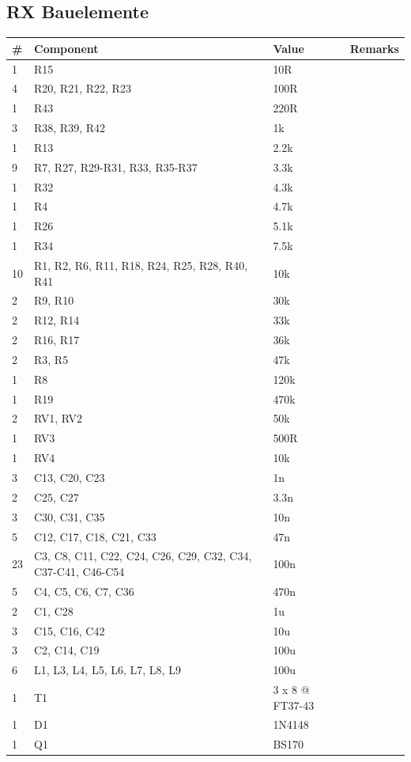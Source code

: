 \documentclass[10pt, a4paper,twoside]{scrartcl}
\begin{document}
\subsection{RX Bauelemente}  \label{sec:rxcomp}
\begin{longtable}{|l|p{6cm}|l|l|} \hline 
\# & Component & Value & Remarks \\ \hline 
1 & R15 & 10R & \\
4 & R20, R21, R22, R23 & 100R & \\
1 & R43 & 220R & \\
3 & R38, R39, R42 & 1k & \\
1 & R13 & 2.2k & \\
9 & R7, R27, R29-R31, R33, R35-R37 & 3.3k & \\
1 & R32 & 4.3k & \\
1 & R4 & 4.7k & \\
1 & R26 & 5.1k & \\
1 & R34 & 7.5k & \\
10 & R1, R2, R6, R11, R18, R24, R25, R28, R40, R41 & 10k & \\
2 & R9, R10 & 30k & \\
2 & R12, R14 & 33k & \\
2 & R16, R17 & 36k & \\
2 & R3, R5 & 47k & \\
1 & R8 & 120k & \\
1 & R19 & 470k & \\
2 & RV1, RV2 & 50k & \\
1 & RV3 & 500R & \\
1 & RV4 & 10k & \\
3 & C13, C20, C23 & 1n & \\
2 & C25, C27 & 3.3n & \\
3 & C30, C31, C35 & 10n & \\
5 & C12, C17, C18, C21, C33 & 47n & \\
23 & C3, C8, C11, C22, C24, C26, C29, C32, C34, C37-C41, C46-C54 & 100n & \\
5 & C4, C5, C6, C7, C36 & 470n & \\
2 & C1, C28 & 1u & \\
3 & C15, C16, C42 & 10u & \\
3 & C2, C14, C19 & 100u & \\
6 & L1, L3, L4, L5, L6, L7, L8, L9 & 100u & \\
1 & T1 & 3 x 8 @ FT37-43 & \\
1 & D1 & 1N4148 & \\
1 & Q1 & BS170 & \\

\end{longtable}
\end{document}
